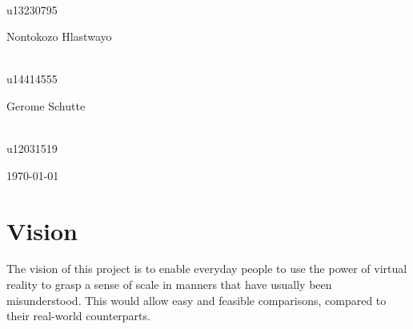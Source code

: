 \documentclass[a4paper,12pt]{report}
\begin{document}
\begin{titlepage}
\begin{center}
\begin{minipage}{0.4\textwidth}
\begin{flushright} \large
\emph{} \\
u13230795  
\end{flushright}
\end{minipage}
\begin{minipage}{0.4\textwidth}
\begin{flushleft} \large
Nontokozo Hlastwayo
\end{flushleft}
\end{minipage}
\begin{minipage}{0.4\textwidth}
\begin{flushright} \large
\emph{} \\
u14414555
\end{flushright}
\end{minipage}
\begin{minipage}{0.4\textwidth}
\begin{flushleft} \large
Gerome Schutte
\end{flushleft}
\end{minipage}
\begin{minipage}{0.4\textwidth}
\begin{flushright} \large
\emph{} \\
u12031519
\end{flushright}
\end{minipage}
\vfill

{\large \today}
\end{center}
\end{titlepage}
\footnotesize
\normalsize

%
%

\tableofcontents
\newpage

%
%
%

\section{Vision}

	The vision of this project is to enable everyday people to use the power of virtual reality to grasp a sense of scale in manners that have usually been misunderstood. This would allow easy and feasible comparisons, compared to their real-world counterparts.
\end{document}
